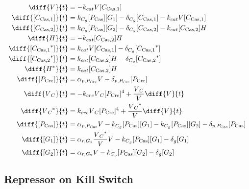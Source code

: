 \begin{align}
\diff{\vectorGen{}}{t} & = - \casCutRate{{}}\vectorGen{}\conc{\cplx{\cas}{1}}\\
\diff{\conc{\cplx{\cas}{1}}}{t} & =  \gRnaBind{}\conc{\proSp{\cas{}}}\conc{\gRna{1}} - \casCompDegradeRate{}\conc{\cplx{\cas}{1}} - \casCutRate{{}}\vectorGen{}\conc{\cplx{\cas}{1}}\\
\diff{\conc{\cplx{\cas}{2}}}{t} & =  \gRnaBind{}\conc{\proSp{\cas{}}}\conc{\gRna{2}} - \casCompDegradeRate{}\conc{\cplx{\cas}{2}} - \casCutRate{{}}\conc{\cplx{\cas}{2}}\hostGen{}\\
\diff{\hostGen{}}{t} & = - \casCutRate{{}}\conc{\cplx{\cas}{2}}\hostGen{}\\
\diff{\conc{\bound{\cplx{\cas}{1}}}}{t} & =  \casCutRate{{}}\vectorGen{}\conc{\cplx{\cas}{1}} - \casCompDegradeRate{}\conc{\bound{\cplx{\cas}{1}}}\\
\diff{\conc{\bound{\cplx{\cas}{2}}}}{t} & =  \casCutRate{{}}\conc{\cplx{\cas}{2}}\hostGen{} - \casCompDegradeRate{}\conc{\bound{\cplx{\cas}{2}}}\\
\diff{\edited{\hostGen{}}}{t} & =  \casCutRate{{}}\conc{\cplx{\cas}{2}}\hostGen{}\\
\diff{\conc{\proSp{\cre{}}}}{t} & =  \txtlRate{\proSp{\cre{}}}\vectorGen{} - \proDegradeRate{\proSp{\cre{}}}\conc{\proSp{\cre{}}}\\
\diff{\vectorGen{}_C}{t} & = - \creCutRate{} \vectorGen{}_C \conc{\proSp{\cre{}}}^4 + \frac{\vectorGen{}_C}{\vectorGen{}} \diff{\vectorGen{}}{t}\\
\diff{\edited{\vectorGen{}_C}}{t} & =  \creCutRate{} \vectorGen{}_C \conc{\proSp{\cre{}}}^4 + \frac{\edited{\vectorGen{}_C}}{\vectorGen{}} \diff{\vectorGen{}}{t}\\
\diff{\conc{\proSp{\cas{}}}}{t} & =  \txtlRate{\proSp{\cas{}}}\vectorGen{} - \gRnaBind{}\conc{\proSp{\cas{}}}\conc{\gRna{1}} - \gRnaBind{}\conc{\proSp{\cas{}}}\conc{\gRna{2}} - \proDegradeRate{\proSp{\cas{}}}\conc{\proSp{\cas{}}}\\
\diff{\conc{\gRna{1}}}{t} & =  \txRate{\gRna{1}}\frac{\edited{\vectorGen{}_C}}{\vectorGen{}}\vectorGen{} - \gRnaBind{}\conc{\proSp{\cas{}}}\conc{\gRna{1}} - \rnaDegradeRate{}\conc{\gRna{1}}\\
\diff{\conc{\gRna{2}}}{t} & =  \txRate{\gRna{2}}\vectorGen{} - \gRnaBind{}\conc{\proSp{\cas{}}}\conc{\gRna{2}} - \rnaDegradeRate{}\conc{\gRna{2}}
\end{align}

\subsection{Repressor on Kill Switch}
\label{s:TF_delayed_kill_switch}

